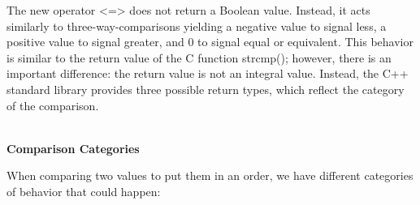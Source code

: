 The new operator <=> does not return a Boolean value. Instead, it acts similarly to three-way-comparisons yielding a negative value to signal less, a positive value to signal greater, and 0 to signal equal or equivalent. This behavior is similar to the return value of the C function strcmp(); however, there is an important difference: the return value is not an integral value. Instead, the C++ standard library provides three possible return types, which reflect the category of the comparison.

\noindent
\hspace*{\fill} \\ %
\textbf{Comparison Categories}

When comparing two values to put them in an order, we have different categories of behavior that could happen:

